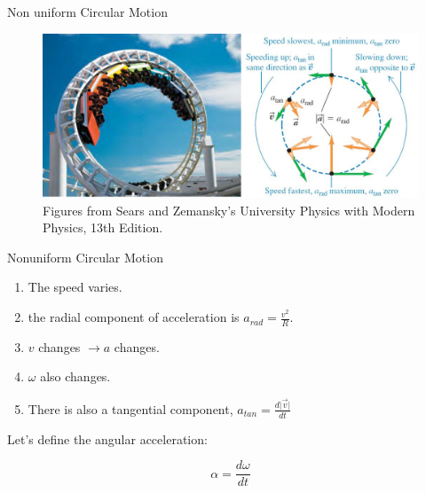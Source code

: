 \documentclass[]{beamer}
\begin{document}
 \begin{frame}
  Non uniform Circular Motion
  
  \vspace{5mm}
  
  
  \begin{figure}[h!]  
      \includegraphics[width=1.\textwidth]{images/37.jpg}
      \caption{ {\tiny Figures from Sears and Zemansky's University Physics 
      with Modern Physics, 13th Edition.} }
    \end{figure}
  
  
  
  
      \end{frame}
  

 \begin{frame}
    Nonuniform Circular Motion
    
    
    
 \begin{enumerate}
    \item The speed varies.
    \item the radial component of acceleration is $a_{rad}=\frac{v^2}{R}$.
    \item  $v$ changes $\rightarrow a$ changes.
    \item $\omega$ also changes.
    \item There is also a tangential component, $a_{tan}=\frac{d\vert \vec v \vert}{d t}$
 \end{enumerate}
    
    \vspace{5mm}
    \pause
    Let's define the angular acceleration:

    \begin{equation}
        \alpha=\frac{d \omega}{d t}
    \end{equation}

        \end{frame}
    
\end{document}
